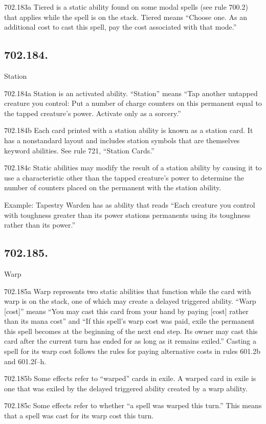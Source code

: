 702.183a Tiered is a static ability found on some modal spells (see rule 700.2) that applies while the spell is on the stack. Tiered means “Choose one. As an additional cost to cast this spell, pay the cost associated with that mode.”

\subsection*{702.184.}
Station

702.184a Station is an activated ability. “Station” means “Tap another untapped creature you control: Put a number of charge counters on this permanent equal to the tapped creature’s power. Activate only as a sorcery.”

702.184b Each card printed with a station ability is known as a station card. It has a nonstandard layout and includes station symbols that are themselves keyword abilities. See rule 721, “Station Cards.”

702.184c Static abilities may modify the result of a station ability by causing it to use a characteristic other than the tapped creature’s power to determine the number of counters placed on the permanent with the station ability.

Example: Tapestry Warden has as ability that reads “Each creature you control with toughness greater than its power stations permanents using its toughness rather than its power.”

\subsection*{702.185.}
Warp

702.185a Warp represents two static abilities that function while the card with warp is on the stack, one of which may create a delayed triggered ability. “Warp [cost]” means “You may cast this card from your hand by paying [cost] rather than its mana cost” and “If this spell’s warp cost was paid, exile the permanent this spell becomes at the beginning of the next end step. Its owner may cast this card after the current turn has ended for as long as it remains exiled.” Casting a spell for its warp cost follows the rules for paying alternative costs in rules 601.2b and 601.2f–h.

702.185b Some effects refer to “warped” cards in exile. A warped card in exile is one that was exiled by the delayed triggered ability created by a warp ability.

702.185c Some effects refer to whether “a spell was warped this turn.” This means that a spell was cast for its warp cost this turn.

